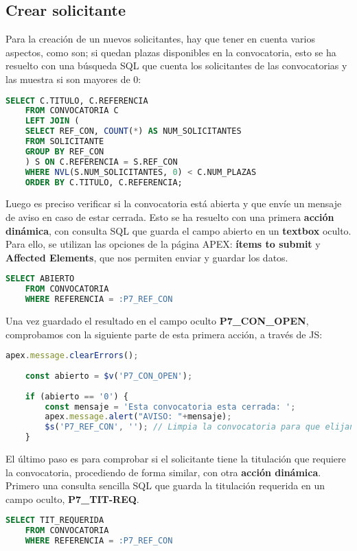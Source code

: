 \subsection{Crear solicitante}
Para la creación de un nuevos solicitantes, hay que tener en cuenta varios aspectos, como son;
si quedan plazas disponibles en la convocatoria, esto se ha resuelto con una búsqueda \acrshort{SQL} que cuenta los solicitantes de las convocatorias y las muestra si son mayores de 0:
\begin{lstlisting}[language=SQL, caption={Presenta informe de solicitantes}]
	SELECT C.TITULO, C.REFERENCIA
	FROM CONVOCATORIA C
	LEFT JOIN (
	SELECT REF_CON, COUNT(*) AS NUM_SOLICITANTES
	FROM SOLICITANTE
	GROUP BY REF_CON
	) S ON C.REFERENCIA = S.REF_CON
	WHERE NVL(S.NUM_SOLICITANTES, 0) < C.NUM_PLAZAS
	ORDER BY C.TITULO, C.REFERENCIA;
\end{lstlisting}
Luego es preciso verificar si la convocatoria está abierta y que envíe un mensaje de aviso en caso de estar cerrada. Esto se ha resuelto con una primera \textbf{acción dinámica}, con consulta \acrshort{SQL} que guarda el campo abierto en un \textbf{textbox} oculto. Para ello, se utilizan las opciones de la página \acrshort{APEX}: \textbf{ítems to submit} y \textbf{Affected Elements}, que nos permiten enviar y guardar los datos.
\begin{lstlisting}[language=SQL, caption={Comprueba campo abierto de convocatoria}]
	SELECT ABIERTO
	FROM CONVOCATORIA 
	WHERE REFERENCIA = :P7_REF_CON 
\end{lstlisting}
Una vez guardado el resultado en el campo oculto \textbf{P7\_CON\_OPEN}, comprobamos con la siguiente parte de esta primera acción, a través de \acrshort{JS}:
\begin{lstlisting}[language=JavaScript, caption={Control y aviso de convocatoria cerrada}]
	apex.message.clearErrors();
	
	const abierto = $v('P7_CON_OPEN');
	
	if (abierto == '0') {
		const mensaje = 'Esta convocatoria esta cerrada: ';
		apex.message.alert("AVISO: "+mensaje);
		$s('P7_REF_CON', ''); // Limpia la convocatoria para que elijan otra
	} 
\end{lstlisting}
El último paso es para comprobar si el solicitante tiene la titulación que requiere la convocatoria, procediendo de forma similar, con otra \textbf{acción dinámica}. Primero una consulta sencilla \acrshort{SQL} que guarda la titulación requerida en un campo oculto, \textbf{\textbf{P7\_TIT-REQ}}.
\begin{lstlisting}[language=SQL, caption={Comprueba campo de titulación requerida}]
	SELECT TIT_REQUERIDA
	FROM CONVOCATORIA 
	WHERE REFERENCIA = :P7_REF_CON
\end{lstlisting}
